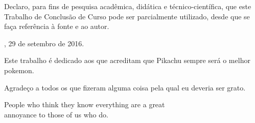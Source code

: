 \documentclass[times,english,brazil,oneside]{ifes8}
\begin{document}
\begin{declaracaodoautor}

  \vspace*{1.5cm}

  Declaro, para fins de pesquisa acadêmica, didática e
  técnico-científica, que este Trabalho de Conclusão de Curso pode ser
  parcialmente utilizado, desde que se faça referência à fonte e ao
  autor.

  \vspace*{2.5cm}

  \centering

  \imprimirlocal, 29 de setembro de 2016.

  \vspace*{2.5cm}

  \imprimirautor

  \vspace*{\fill}
  
\end{declaracaodoautor}


\begin{dedicatoria}
  \vspace*{\fill}
  \hspace{0.2\textwidth}
  \begin{minipage}{0.8\textwidth}
    Este trabalho é dedicado aos que acreditam que Pikachu sempre será o
    melhor pokemon.
  \end{minipage}
\end{dedicatoria}


\begin{agradecimentos}
  Agradeço a todos os que fizeram alguma coisa pela qual eu deveria
  ser grato.
\end{agradecimentos}


\begin{epigrafe}
  \vspace*{\fill}
  \begin{otherlanguage}{english}
    \begin{flushright}
      \begin{SingleSpace}
        People who think they know everything are a great \\
        annoyance to those of us who do. \cite{Asimov2004}
      \end{SingleSpace}
    \end{flushright}
  \end{otherlanguage}
\end{epigrafe}
\end{document}
